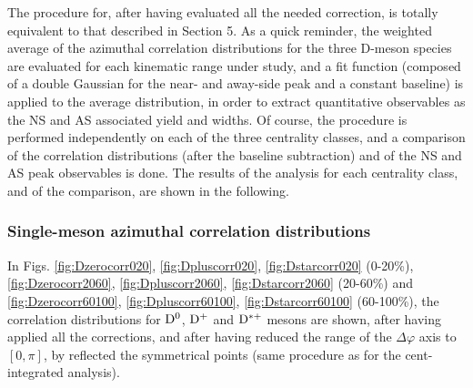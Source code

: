 The procedure for, after having evaluated all the needed correction, is totally equivalent to that described in Section 5.
As a quick reminder, the weighted average of the azimuthal correlation distributions for the three D-meson species are evaluated for each kinematic range under study, and a fit function (composed of a double Gaussian for the near- and away-side peak and a constant baseline) is applied to the average distribution, in order to extract quantitative observables as the NS and AS associated yield and widths.
Of course, the procedure is performed independently on each of the three centrality classes, and a comparison of the correlation distributions (after the baseline subtraction) and of the NS and AS peak observables is done.
The results of the analysis for each centrality class, and of the comparison, are shown in the following.

\subsubsection{Single-meson azimuthal correlation distributions}
In Figs. \ref{fig:Dzerocorr020}, \ref{fig:Dpluscorr020}, \ref{fig:Dstarcorr020} (0-20\%), \ref{fig:Dzerocorr2060}, \ref{fig:Dpluscorr2060}, \ref{fig:Dstarcorr2060} (20-60\%) and \ref{fig:Dzerocorr60100}, \ref{fig:Dpluscorr60100}, \ref{fig:Dstarcorr60100} (60-100\%), the correlation distributions for ${\rm D^0}$, ${\rm D^+}$ and ${\rm D^{*+}}$ mesons are shown, after having applied all the corrections, and after having reduced the range of the $\Delta\varphi$ axis to $[0,\pi]$, by reflected the symmetrical points (same procedure as for the cent-integrated analysis).

